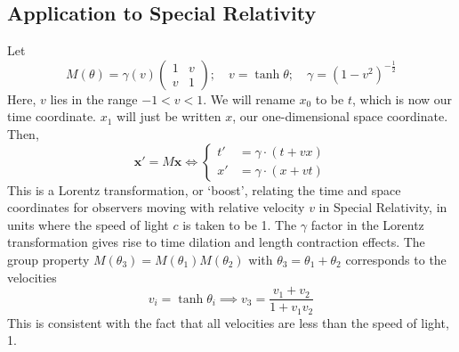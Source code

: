 \documentclass{article}
\begin{document}
\subsection{Application to Special Relativity}
Let
\[ M(\theta) = \gamma(v) \begin{pmatrix}
		1 & v \\ v & 1
	\end{pmatrix};\quad v = \tanh \theta;\quad \gamma = (1 - v^2)^{-\frac{1}{2}} \]
Here, $v$ lies in the range $-1 < v < 1$. We will rename $x_0$ to be $t$, which is now our time coordinate. $x_1$ will just be written $x$, our one-dimensional space coordinate. Then,
\[ \bm x' = M\bm x \iff \begin{cases}
		t' & = \gamma \cdot (t + vx) \\
		x' & = \gamma \cdot (x + vt)
	\end{cases} \]
This is a Lorentz transformation, or `boost', relating the time and space coordinates for observers moving with relative velocity $v$ in Special Relativity, in units where the speed of light $c$ is taken to be 1. The $\gamma$ factor in the Lorentz transformation gives rise to time dilation and length contraction effects. The group property $M(\theta_3) = M(\theta_1)M(\theta_2)$ with $\theta_3 = \theta_1 + \theta_2$ corresponds to the velocities
\[ v_i = \tanh \theta_i \implies v_3 = \frac{v_1 + v_2}{1 + v_1 v_2} \]
This is consistent with the fact that all velocities are less than the speed of light, 1.
\end{document}
